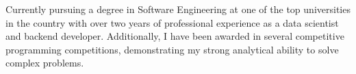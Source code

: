 \documentclass[a4paper,12pt]{article}
\begin{document}

Currently pursuing a degree in Software Engineering at one of the top universities in the country
with over two years of professional experience as a data scientist and backend developer.
Additionally, I have been awarded in several competitive programming competitions, demonstrating my strong
analytical ability to solve complex problems.
\end{document}

